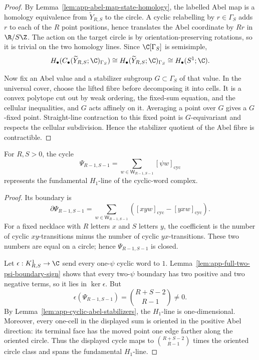 \begin{proof}
  By Lemma~\ref{lem:app-abel-map-state-homology}, the labelled Abel map
  is a homology equivalence from \(\widetilde Y_{R,S}\) to the circle.  A
  cyclic relabelling by \(r\in \Gamma_S\) adds \(r\) to each of the \(R\) point
  positions, hence translates the Abel coordinate by \(Rr\) in
  \(\R/S\Z\).  The action on the target circle is by
  orientation-preserving rotations, so it is trivial on the two homology
  lines.  Since \(\C[\Gamma_S]\) is semisimple,
  \[
    H_\bullet(C_\bullet(\widetilde Y_{R,S};\C)_{\Gamma_S})
      \cong H_\bullet(\widetilde Y_{R,S};\C)_{\Gamma_S}
      \cong H_\bullet(S^1;\C).
  \]

  Now fix an Abel value and a stabilizer subgroup \(G\subset \Gamma_S\) of that
  value.  In the universal cover, choose the lifted fibre before decomposing
  it into cells.  It is a convex polytope cut out by weak ordering, the
  fixed-sum equation, and the cellular inequalities, and \(G\) acts affinely
  on it.  Averaging a point over \(G\) gives a \(G\)-fixed point.  Straight-line
  contraction to this fixed point is \(G\)-equivariant and respects the
  cellular subdivision.  Hence the stabilizer quotient of the Abel fibre is
  contractible.
\end{proof}

\begin{lem}[\(S^1\) generator]
\label{lem:app-full-s1-generator}
  For \(R,S>0\), the cycle
  \[
    \Psi_{R-1,S-1}
      =
      \sum_{w\in\mathsf W_{R-1,S-1}}[\psi w]_{\mathrm{cyc}}
  \]
  represents the fundamental \(H_1\)-line of the cyclic-word
  complex.
\end{lem}

\begin{proof}
  Its boundary is
  \[
    \partial\Psi_{R-1,S-1}
      =
      \sum_{w\in\mathsf W_{R-1,S-1}}
      ([xyw]_{\mathrm{cyc}}-[yxw]_{\mathrm{cyc}}).
  \]
  For a fixed necklace with \(R\) letters \(x\) and \(S\) letters \(y\),
  the coefficient is the number of cyclic \(xy\)-transitions minus the
  number of cyclic \(yx\)-transitions.  These two numbers are equal on a
  circle; hence \(\Psi_{R-1,S-1}\) is closed.

  Let \(\epsilon:K^1_{R,S}\to\C\) send every one-\(\psi\) cyclic word to
  \(1\).  Lemma~\ref{lem:app-full-two-psi-boundary-sign} shows that every
  two-\(\psi\) boundary has two positive and two negative terms, so it
  lies in \(\ker\epsilon\).  But
  \[
    \epsilon(\Psi_{R-1,S-1})=\binom{R+S-2}{R-1}\neq0.
  \]
  By Lemma~\ref{lem:app-cyclic-abel-stabilizers}, the \(H_1\)-line is
  one-dimensional.  Moreover, every one-cell in the displayed sum is oriented
  in the positive Abel direction: its terminal face has the moved point one edge
  farther along the oriented circle.  Thus the displayed cycle maps to
  \(\binom{R+S-2}{R-1}\) times the oriented circle class and spans the
  fundamental \(H_1\)-line.
\end{proof}

